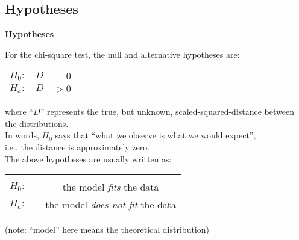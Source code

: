 \documentclass[compress]{beamer}        %
\makeatletter
\newcommand{\tcb}{\textcolor{beamer@blendedblue}}
\makeatother
\begin{document}
\subsection{Hypotheses}
\begin{frame}{\bf \tcb{Hypotheses}}

For the chi-square test, the null and alternative hypotheses are:

\begin{center}
\begin{tabular}{c@{\,\,}c}
$H_0: \quad D$ & $= 0$\\[0.2cm]
$H_a: \quad D$ &  $> 0$ \\[0.1cm]
\end{tabular}
\end{center}
where ``$D$'' represents the true, but unknown, scaled-squared-distance between the distributions.\\[0.4cm]

In words, $H_0$ says that ``what we observe is what we would expect'',\\ i.e., the distance is approximately zero.\\[0.4cm]

The above hypotheses are usually written as:

\begin{center}
\begin{tabular}{|c@{\,\,}c|}
\hline
&\\[-0.4cm]
$H_0: \quad$ & the model \emph{fits} the data\\[0.2cm]
$H_a: \quad$ & the model \emph{does not fit} the data\\[0.1cm]
\hline
\end{tabular}
\end{center}

{\footnotesize(note: ``model'' here means the theoretical distribution)}
\end{frame}
\end{document}

